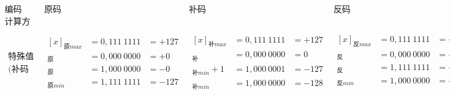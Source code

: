 $$
    \begin{array}{|l|l|l|l|l|}
        \hline
        \text{编码（表示法）}                                                & \text{原码} & \text{补码} & \text{反码} & \text{移码}
        \\
        \hline
        \text{计算方法}                                                   &           &           &           &           \\
        \\
        \hline
        \begin{array}{l}
            特殊值 \\
            \text{(补码和移码为通常情况)}
        \end{array}                                           &
        \begin{array}{lll}
            [x]_{\text{原}max} & = 0,111 \ 1111 & = +127 \\
            [+0]_\text{原}     & = 0,000 \ 0000 & =+0    \\
            [-0]_\text{原}     & = 1,000 \ 0000 & =-0    \\
            [x]_{\text{原}min} & = 1,111 \ 1111 & = -127
        \end{array}   &
        \begin{array}{lll}
            [x]_{\text{补}max}   & = 0,111 \ 1111 & = +127 \\
            [0]_\text{补}        & = 0,000 \ 0000 & =0     \\
            [x]_{\text{补}min}+1 & = 1,000 \ 0001 & = -127 \\
            [x]_{\text{补}min}   & = 1,000 \ 0000 & = -128
        \end{array} &
        \begin{array}{lll}
            [x]_{\text{反}max} & = 0,111 \ 1111 & = +127 \\
            [+0]_\text{反}     & = 0,000 \ 0000 & =+0    \\
            [-0]_\text{反}     & = 1,111 \ 1111 & =-0    \\
            [x]_{\text{反}min} & = 1,000 \ 0000 & = -127 \\
        \end{array}  &
        \begin{array}{lll}
            [x]_{\text{移}max} & = 1,111 \ 1111 & = +127 \\
            [0]_\text{移}      & = 1,000 \ 0000 & =0
            \\          [x]_{\text{移}min}+1 &= 0,000 \ 0001 &=-127

\end{array}
\end{array}$$
